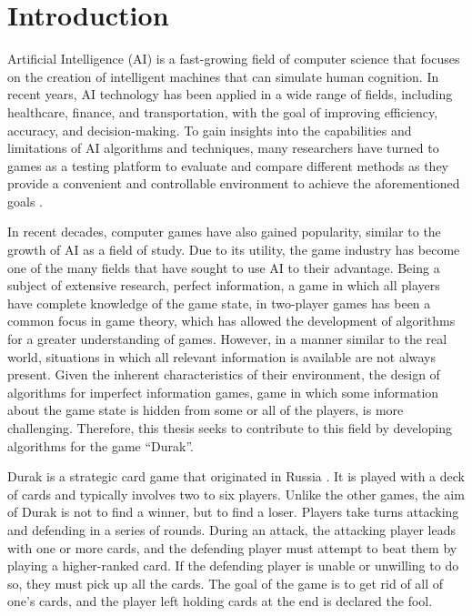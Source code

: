 \chapter*{Introduction}

Artificial Intelligence (AI) is a fast-growing field of computer science that focuses on the creation of intelligent machines that can simulate human cognition. In recent years, AI technology has been applied in a wide range of fields, including healthcare, finance, and transportation, with the goal of improving efficiency, accuracy, and decision-making. To gain insights into the capabilities and limitations of AI algorithms and techniques, many researchers have turned to games as a testing platform to evaluate and compare different methods as they provide a convenient and controllable environment to achieve the aforementioned goals \citep{Silver2016MasteringTG}. 

In recent decades, computer games have also gained popularity, similar to the growth of AI as a field of study. Due to its utility, the game industry has become one of the many fields that have sought to use AI to their advantage. Being a subject of extensive research, perfect information, a game in which all players have complete knowledge of the game state, in two-player games has been a common focus in game theory, which has allowed the development of algorithms for a greater understanding of games. However, in a manner similar to the real world, situations in which all relevant information is available are not always present. Given the inherent characteristics of their environment, the design of algorithms for imperfect information games, game in which some information about the game state is hidden from some or all of the players, is more challenging. Therefore, this thesis seeks to contribute to this field by developing algorithms for the game ``Durak''.

Durak is a strategic card game that originated in Russia \citep*{website:PAGAT_DURAK}. It is played with a deck of cards and typically involves two to six players. Unlike the other games, the aim of Durak is not to find a winner, but to find a loser. Players take turns attacking and defending in a series of rounds. During an attack, the attacking player leads with one or more cards, and the defending player must attempt to beat them by playing a higher-ranked card. If the defending player is unable or unwilling to do so, they must pick up all the cards. The goal of the game is to get rid of all of one's cards, and the player left holding cards at the end is declared the fool. 

